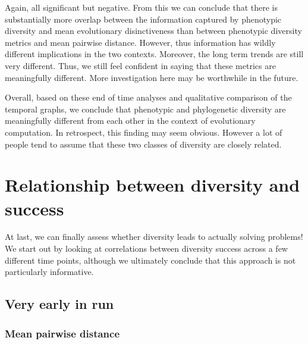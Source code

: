 \documentclass[]{book}
\begin{document}
Again, all significant but negative. From this we can conclude that there is substantially more overlap between the information captured by phenotypic diversity and mean evolutionary disinctiveness than between phenotypic diversity metrics and mean pairwise distance. However, thus information has wildly different implications in the two contexts. Moreover, the long term trends are still very different. Thus, we still feel confident in saying that these metrics are meaningfully different. More investigation here may be worthwhile in the future.

Overall, based on these end of time analyses and qualitative comparison of the temporal graphs, we conclude that phenotypic and phylogenetic diversity are meaningfully different from each other in the context of evolutionary computation. In retrospect, this finding may seem obvious. However a lot of people tend to assume that these two classes of diversity are closely related.

\hypertarget{relationship-between-diversity-and-success}{%
\section{Relationship between diversity and success}\label{relationship-between-diversity-and-success}}

At last, we can finally assess whether diversity leads to actually solving problems! We start out by looking at correlations between diversity success across a few different time points,
although we ultimately conclude that this approach is not particularly informative.

\hypertarget{very-early-in-run}{%
\subsection{Very early in run}\label{very-early-in-run}}

\hypertarget{mean-pairwise-distance-2}{%
\subsubsection{Mean pairwise distance}\label{mean-pairwise-distance-2}}
\end{document}

